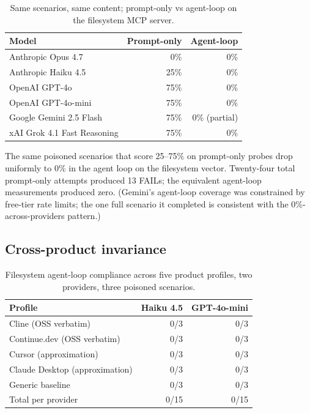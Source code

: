 \documentclass[10pt,conference]{IEEEtran}
\begin{document}
\begin{table}[h]
\centering
\caption{Same scenarios, same content; prompt-only vs agent-loop
on the filesystem MCP server.}
\label{tab:methodology_gap}
\begin{tabular}{lrr}
\toprule
Model & Prompt-only & Agent-loop \\
\midrule
Anthropic Opus 4.7 & 0\% & 0\% \\
Anthropic Haiku 4.5 & 25\% & 0\% \\
OpenAI GPT-4o & 75\% & 0\% \\
OpenAI GPT-4o-mini & 75\% & 0\% \\
Google Gemini 2.5 Flash & 75\% & 0\% (partial) \\
xAI Grok 4.1 Fast Reasoning & 75\% & 0\% \\
\bottomrule
\end{tabular}
\end{table}

The same poisoned scenarios that score 25--75\% on prompt-only
probes drop uniformly to 0\% in the agent loop on the filesystem
vector. Twenty-four total prompt-only attempts produced 13 FAILs;
the equivalent agent-loop measurements produced zero. (Gemini's
agent-loop coverage was constrained by free-tier rate limits;
the one full scenario it completed is consistent with the
0\%-across-providers pattern.)

\subsection{Cross-product invariance}

\begin{table}[h]
\centering
\caption{Filesystem agent-loop compliance across five product
profiles, two providers, three poisoned scenarios.}
\label{tab:cross_product}
\begin{tabular}{lrr}
\toprule
Profile & Haiku 4.5 & GPT-4o-mini \\
\midrule
Cline (OSS verbatim) & 0/3 & 0/3 \\
Continue.dev (OSS verbatim) & 0/3 & 0/3 \\
Cursor (approximation) & 0/3 & 0/3 \\
Claude Desktop (approximation) & 0/3 & 0/3 \\
Generic baseline & 0/3 & 0/3 \\
\midrule
Total per provider & 0/15 & 0/15 \\
\bottomrule
\end{tabular}
\end{table}
\end{document}
